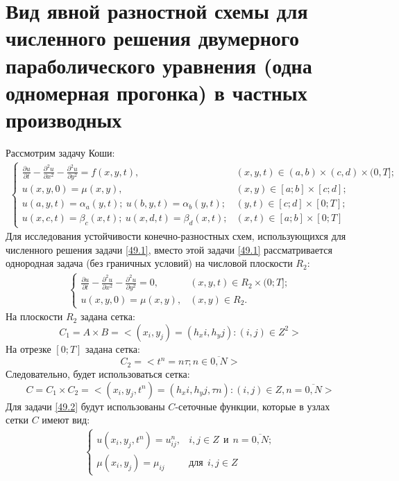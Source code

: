 \documentclass[__main__.tex]{subfiles}
\begin{document}
\section{Вид явной разностной схемы для численного решения двумерного параболического уравнения (одна одномерная прогонка) в частных производных}

Рассмотрим задачу Коши:\\
\begin{gather}
\label{49.1}
\begin{cases}
\frac{\partial u}{\partial t} - \frac{\partial ^2 u}{\partial x^2} - \frac{\partial ^2 u}{\partial y^2} = f (x,y,t), & (x,y,t) \in (a,b) \times (c,d) \times (0,T];\\
u(x,y,0) = \mu (x,y), & (x,y) \in [a;b] \times [c;d];\\
u(a,y,t) = \alpha_a (y,t); \ u(b,y,t) = \alpha_b (y,t); & (y,t) \in [c;d] \times [0;T];\\
u(x,c,t) = \beta_c (x,t); \ u(x,d,t) = \beta_d (x,t); & (x,t) \in [a;b] \times [0;T]
\end{cases}
\end{gather}
Для исследования устойчивости конечно-разностных схем, использующихся для численного решения задачи \ref{49.1}, вместо этой задачи \ref{49.1} рассматривается однородная задача (без граничных условий) на числовой плоскости $R_2$:\\
\begin{gather}
\label{49.2}
\begin{cases}
\frac{\partial u}{\partial t} - \frac{\partial ^2 u}{\partial x^2} - \frac{\partial ^2 u}{\partial y^2} = 0, & (x,y,t) \in R_2 \times (0;T];\\
u(x,y,0) = \mu(x,y), & (x,y) \in R_2.
\end{cases}
\end{gather}
На плоскости $R_2$ задана сетка:\\
$$
C_1 = A \times B = <(x_i, y_j) = (h_x i, h_y j): (i,j) \in Z^2>
$$
На отрезке $[0;T]$ задана сетка:\\
$$
C_2 = <t^n = n \tau; n \in \overline{0,N}>
$$
Следовательно, будет использоваться сетка:\\
$$
C = C_1 \times C_2 = <(x_i, y_j, t^n) = (h_x i, h_y j, \tau n): (i,j) \in Z, n = \overline{0,N}>
$$
Для задачи \ref{49.2} будут использованы $C$-сеточные функции, которые в узлах сетки $C$ имеют вид:\\
\begin{gather}
\begin{cases}
u(x_i,y_j,t^n) = u_{ij}^n , & i,j \in Z \ \ \text{и} \ \ n = \overline{0,N};\\
\mu (x_i,y_j) = \mu_{ij} & \text{для} \ \ i,j \in Z
\end{cases}
\end{gather}
\end{document}
